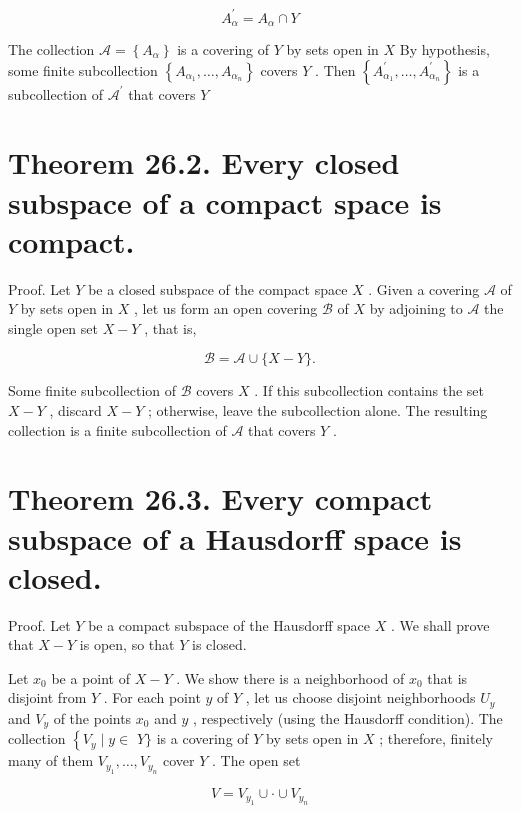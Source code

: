\[
{A}_{\alpha }^{\prime } = {A}_{\alpha } \cap  Y
\]

The collection \(\mathcal{A} = \left\{  {A}_{\alpha }\right\}\) is a covering of \(Y\) by sets open in \(X\) By hypothesis, some finite subcollection \(\left\{  {{A}_{{\alpha }_{1}},\ldots ,{A}_{{\alpha }_{n}}}\right\}\) covers \(Y\) . Then \(\left\{  {{A}_{{\alpha }_{1}}^{\prime },\ldots ,{A}_{{\alpha }_{n}}^{\prime }}\right\}\) is a subcollection of \({\mathcal{A}}^{\prime }\) that covers \(Y\)

\section*{Theorem 26.2. Every closed subspace of a compact space is compact.}

Proof. Let \(Y\) be a closed subspace of the compact space \(X\) . Given a covering \(\mathcal{A}\) of \(Y\) by sets open in \(X\) , let us form an open covering \(\mathcal{B}\) of \(X\) by adjoining to \(\mathcal{A}\) the single open set \(X - Y\) , that is,

\[
\mathcal{B} = \mathcal{A} \cup  \{ X - Y\} .
\]

Some finite subcollection of \(\mathcal{B}\) covers \(X\) . If this subcollection contains the set \(X - Y\) , discard \(X - Y\) ; otherwise, leave the subcollection alone. The resulting collection is a finite subcollection of \(\mathcal{A}\) that covers \(Y\) .

\section*{Theorem 26.3. Every compact subspace of a Hausdorff space is closed.}

Proof. Let \(Y\) be a compact subspace of the Hausdorff space \(X\) . We shall prove that \(X - Y\) is open, so that \(Y\) is closed.

Let \({x}_{0}\) be a point of \(X - Y\) . We show there is a neighborhood of \({x}_{0}\) that is disjoint from \(Y\) . For each point \(y\) of \(Y\) , let us choose disjoint neighborhoods \({U}_{y}\) and \({V}_{y}\) of the points \({x}_{0}\) and \(y\) , respectively (using the Hausdorff condition). The collection \(\left\{  {{V}_{y} \mid  y \in  }\right.\)  \(Y\}\) is a covering of \(Y\) by sets open in \(X\) ; therefore, finitely many of them \({V}_{{y}_{1}},\ldots ,{V}_{{y}_{n}}\) cover \(Y\) . The open set

\[
V = {V}_{{y}_{1}} \cup   \cdot   \cup  {V}_{{y}_{n}}
\]

